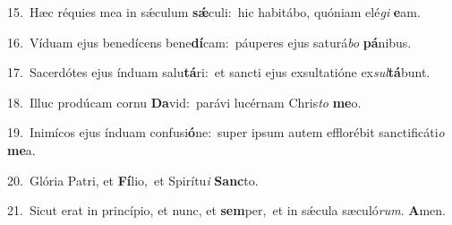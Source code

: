 {\numbfont\textcolor{\numbcolor}{15.}}~Hæc réquies mea in sǽculum \textbf{sǽ}\-culi:~\star hic habitábo, quóniam elé\textit{gi} \textbf{e}\-am.\par
{\numbfont\textcolor{\numbcolor}{16.}}~Víduam ejus benedícens bene\-\textbf{dí}\-cam:~\star páuperes ejus saturá\textit{bo} \textbf{pá}\-nibus.\par
{\numbfont\textcolor{\numbcolor}{17.}}~Sacerdótes ejus índuam salu\-\textbf{tá}\-ri:~\star et sancti ejus exsultatióne ex\-\textit{sul}\-\textbf{tá}bunt.\par
{\numbfont\textcolor{\numbcolor}{18.}}~Illuc prodúcam cornu \textbf{Da}\-vid:~\star parávi lucérnam Chris\textit{to} \textbf{me}\-o.\par
{\numbfont\textcolor{\numbcolor}{19.}}~Inimícos ejus índuam confusi\-\textbf{ó}\-ne:~\star super ipsum autem efflorébit sanctificáti\textit{o} \textbf{me}\-a.\par
{\numbfont\textcolor{\numbcolor}{20.}}~Glória Patri, et \textbf{Fí}\-lio,~\star et Spirítu\textit{i} \textbf{Sanc}\-to.\par
{\numbfont\textcolor{\numbcolor}{21.}}~Sicut erat in princípio, et nunc, et \textbf{sem}\-per,~\star et in sǽcula sæculó\-\textit{rum}\-. \textbf{A}\-men.\par
